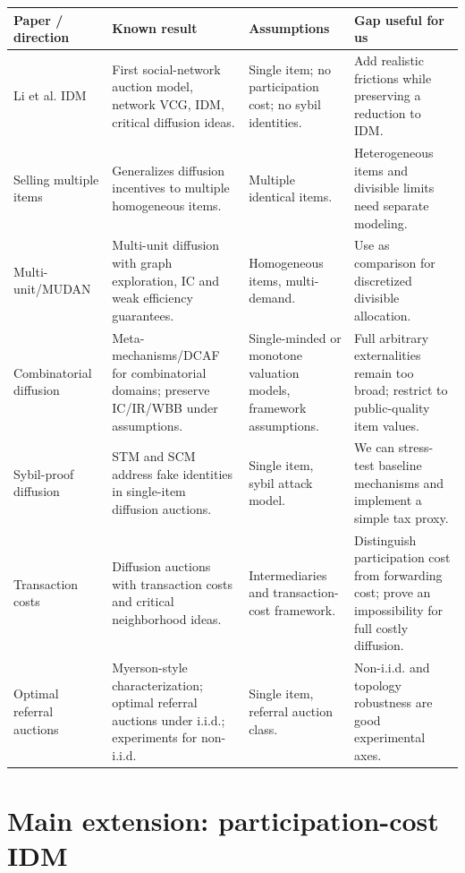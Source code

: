 \documentclass[11pt]{article}
\begin{document}
\begin{longtable}{p{}p{}p{}p{}}
\toprule
\textbf{Paper / direction} & \textbf{Known result} & \textbf{Assumptions} & \textbf{Gap useful for us}\\
\midrule
Li et al. IDM~\cite{li2017mdsn,li2022diffusion} & First social-network auction model, network VCG, IDM, critical diffusion ideas. & Single item; no participation cost; no sybil identities. & Add realistic frictions while preserving a reduction to IDM.\\
\addlinespace
Selling multiple items~\cite{zhao2018multi} & Generalizes diffusion incentives to multiple homogeneous items. & Multiple identical items. & Heterogeneous items and divisible limits need separate modeling.\\
\addlinespace
Multi-unit/MUDAN~\cite{fang2023multiunit} & Multi-unit diffusion with graph exploration, IC and weak efficiency guarantees. & Homogeneous items, multi-demand. & Use as comparison for discretized divisible allocation.\\
\addlinespace
Combinatorial diffusion~\cite{fang2024meta,li2024combinatorial} & Meta-mechanisms/DCAF for combinatorial domains; preserve IC/IR/WBB under assumptions. & Single-minded or monotone valuation models, framework assumptions. & Full arbitrary externalities remain too broad; restrict to public-quality item values.\\
\addlinespace
Sybil-proof diffusion~\cite{chen2023sybil} & STM and SCM address fake identities in single-item diffusion auctions. & Single item, sybil attack model. & We can stress-test baseline mechanisms and implement a simple tax proxy.\\
\addlinespace
Transaction costs~\cite{li2024transaction} & Diffusion auctions with transaction costs and critical neighborhood ideas. & Intermediaries and transaction-cost framework. & Distinguish participation cost from forwarding cost; prove an impossibility for full costly diffusion.\\
\addlinespace
Optimal referral auctions~\cite{bhattacharyya2024optimal} & Myerson-style characterization; optimal referral auctions under i.i.d.; experiments for non-i.i.d. & Single item, referral auction class. & Non-i.i.d. and topology robustness are good experimental axes.\\
\bottomrule
\end{longtable}

\section{Main extension: participation-cost IDM}
\end{document}
